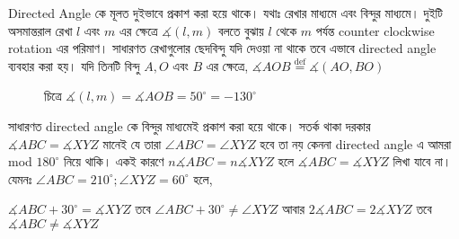 \documentclass[a4paper,11pt]{article}
\newcommand{\drg}{^{\circ}}
\begin{document}
Directed Angle কে মূলত দুইভাবে প্রকাশ করা হয়ে থাকে। যথাঃ রেখার মাধ্যমে এবং বিন্দুর মাধ্যমে। দুইটি অসমান্তরাল রেখা $l$ এবং $m$ এর ক্ষেত্রে $\measuredangle(l,m)$ বলতে বুঝায় $l$ থেকে $m$ পর্যন্ত counter clockwise rotation এর পরিমাণ। সাধারণত রেখাগুলোর ছেদবিন্দু যদি দেওয়া না থাকে তবে এভাবে directed angle ব্যবহার করা হয়। যদি তিনটি বিন্দু $A,O$ এবং $B$ এর ক্ষেত্রে, 
$\measuredangle AOB \overset{\mathrm{def}}{=} \measuredangle(AO,BO)$
\begin{figure}[h]
	\centering
	\caption{চিত্রে $\measuredangle (l,m)=\measuredangle AOB=50\drg=-130\drg$}
\end{figure}

সাধারণত directed angle কে বিন্দুর মাধ্যমেই প্রকাশ করা হয়ে থাকে। সতর্ক থাকা দরকার $\measuredangle ABC=\measuredangle XYZ$ মানেই যে তারা $\angle ABC=\angle XYZ$ হবে তা নয় কেননা directed angle এ আমরা mod $180\drg$ নিয়ে থাকি। একই কারণে $n\measuredangle ABC=n\measuredangle XYZ$ হলে $\measuredangle ABC=\measuredangle XYZ$ লিখা যাবে না। যেমনঃ $\angle ABC=210\drg; \angle XYZ=60\drg$ হলে, 

$\measuredangle ABC+30\drg=\measuredangle XYZ$ তবে $\angle ABC+30\drg \neq \angle XYZ$ আবার $2\measuredangle ABC=2\measuredangle XYZ$ তবে $\measuredangle ABC\neq \measuredangle XYZ$
\end{document}
